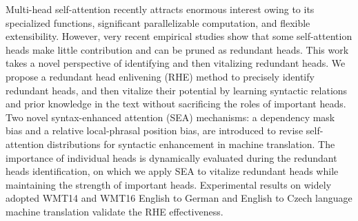 Multi-head self-attention recently attracts enormous interest owing to its specialized functions, significant parallelizable computation, and flexible extensibility. However, very recent empirical studies show that some self-attention heads make little contribution and can be pruned as redundant heads. This work takes a novel perspective of identifying and then vitalizing redundant heads. We propose a redundant head enlivening (RHE) method to precisely identify redundant heads, and then vitalize their potential by learning syntactic relations and prior knowledge in the text without sacrificing the roles of important heads. Two novel syntax-enhanced attention (SEA) mechanisms: a dependency mask bias and a relative local-phrasal position bias, are introduced to revise self-attention distributions for syntactic enhancement in machine translation. The importance of individual heads is dynamically evaluated during the redundant heads identification, on which we apply SEA to vitalize redundant heads while maintaining the strength of important heads. Experimental results on widely adopted WMT14 and WMT16 English to German and English to Czech language machine translation validate the RHE effectiveness.
